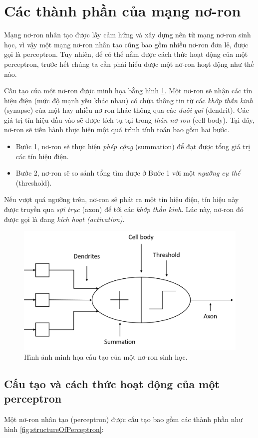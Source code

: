 \section{Các thành phần của mạng nơ-ron}
Mạng nơ-ron nhân tạo được lấy cảm hứng và xây dựng nên từ mạng nơ-ron sinh học, vì vậy một mạng nơ-ron nhân tạo cũng bao gồm nhiều nơ-ron đơn lẻ, được gọi là perceptron. Tuy nhiên, để có thể nắm được cách thức hoạt động của một perceptron, trước hết chúng ta cần phải hiểu được một nơ-ron hoạt động như thế nào.

Cấu tạo của một nơ-ron được minh họa bằng hình \ref{fig:structureOfNeuron}. Một nơ-ron sẽ nhận các tín hiệu điện (mức độ mạnh yếu khác nhau) có chứa thông tin từ các \textit{khớp thần kinh} (synapse) của một hay nhiều nơ-ron khác thông qua các \textit{đuôi gai} (dendrit). Các giá trị tín hiệu đầu vào sẽ được tích tụ tại trong \textit{thân nơ-ron} (cell body). Tại đây, nơ-ron sẽ tiến hành thực hiện một quá trình tính toán bao gồm hai bước. 
\begin{itemize}
\item Bước 1, nơ-ron sẽ thực hiện \textit{phép cộng} (summation) để đạt được tổng giá trị các tín hiệu điện. 
\item Bước 2, nơ-ron sẽ so sánh tổng tìm được ở Bước 1 với một \textit{ngưỡng cụ thể} (threshold). 
\end{itemize}
Nếu vượt quá ngưỡng trên, nơ-ron sẽ phát ra một tín hiệu điện, tín hiệu này được truyền qua \textit{sợi trục} (axon) để tới các \textit{khớp thần kinh}. Lúc này, nơ-ron đó được gọi là đang \textit{kích hoạt (activation)}. 

\begin{figure}[h!]
	\centering
		\includegraphics[width=0.5\columnwidth]{chapter01/figure/Picture1.png}
		\centering
	\caption{Hình ảnh minh họa cấu tạo của một nơ-ron sinh học.}
	\label{fig:structureOfNeuron}
\end{figure}

\subsection{Cấu tạo và cách thức hoạt động của một perceptron}
Một nơ-ron nhân tạo (perceptron) được cấu tạo bao gồm các thành phần như hình \ref{fig:structureOfPerceptron}:

